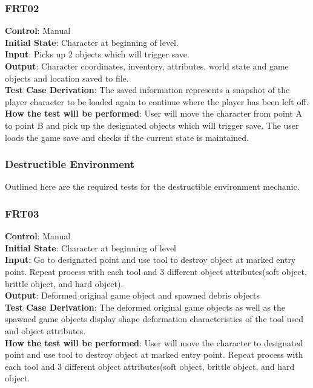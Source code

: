 \documentclass[12pt, titlepage]{article}
\begin{document}
\subsubsection{FRT02}

\textbf{Control}: Manual\\
\textbf{Initial State}: Character at beginning of level.\\
\textbf{Input}: Picks up 2 objects which will trigger save.\\
\textbf{Output}: Character coordinates, inventory, attributes, world state and game objects and location saved to file.\\
\textbf{Test Case Derivation}: The saved information represents a snapshot of the player character to be loaded again to continue where the player has been left off.\\
\textbf{How the test will be performed}: User will move the character from point A to point B and pick up the designated objects which will trigger save.  The user loads the game save and checks if the current state is maintained.\\
\subsubsection{Destructible Environment}

Outlined here are the required tests for the destructible environment mechanic.

\subsubsection{FRT03}

\textbf{Control}: Manual\\
\textbf{Initial State}: Character at beginning of level\\
\textbf{Input}: Go to designated point and use tool to destroy object at marked entry point. Repeat process with each tool and 3 different object attributes(soft object, brittle object, and hard object).\\
\textbf{Output}: Deformed original game object and spawned debris objects\\
\textbf{Test Case Derivation}: The deformed original game objects as well as the spawned game objects display shape deformation characteristics of the tool used and object attributes.\\
\textbf{How the test will be performed}: User will move the character to designated point and use tool to destroy object at marked entry point. Repeat process with each tool and 3 different object attributes(soft object, brittle object, and hard object.\\
\end{document}
